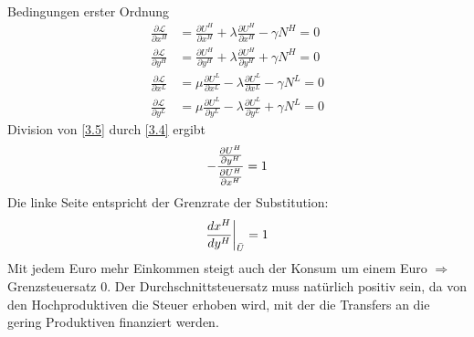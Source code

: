 \documentclass{article}
\begin{document}
\begin{enumerate}[label=(\alph*)]
\begin{align}
		\end{align}
		Bedingungen erster Ordnung
		\begin{align}
			\label{3.4}
			\frac{\partial \mathcal{L}}{\partial x^H} &= \frac{\partial U^H}{\partial x^H} + \lambda\frac{\partial U^H}{\partial x^H} - \gamma N^H =0 \tag{3.4} \\
			\label{3.5}
			\frac{\partial \mathcal{L}}{\partial y^H} &= \frac{\partial U^H}{\partial y^H} + \lambda\frac{\partial U^H}{\partial y^H} + \gamma N^H =0 \tag{3.5} \\
			\label{3.6}
			\frac{\partial \mathcal{L}}{\partial x^L} &= \mu\frac{\partial U^L}{\partial x^L} - \lambda\frac{\partial U^L}{\partial x^L} - \gamma N^L =0 \tag{3.6} \\
			\label{3.7}
			\frac{\partial \mathcal{L}}{\partial y^L} &= \mu\frac{\partial U^L}{\partial y^L} - \lambda\frac{\partial U^L}{\partial y^L} + \gamma N^L =0 \tag{3.7}
		\end{align}
		Division von \eqref{3.5} durch \eqref{3.4} ergibt
		\begin{align}
			-\frac{\frac{\partial U^H}{\partial y^H}}{\frac{\partial U^H}{\partial x^H}} = 1 \notag
		\end{align}
		Die linke Seite entspricht der Grenzrate der Substitution:
		\begin{align}
			\frac{dx^H}{dy^H}\bigg\vert_{\bar{U}} = 1 \notag
		\end{align}
		Mit jedem Euro mehr Einkommen steigt auch der Konsum um einem Euro $\Rightarrow$ Grenzsteuersatz 0. Der Durchschnittsteuersatz muss natürlich positiv sein, da von den Hochproduktiven die Steuer erhoben wird, mit der die Transfers an die gering Produktiven finanziert werden.
	\end{enumerate}
	
\end{document}
